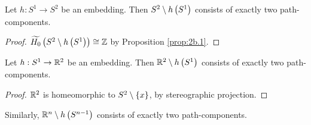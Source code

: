 \begin{corollary}
Let $ h : S^1 \to S^2 $ be an embedding. Then $ S^2 \setminus h\left( S^1 \right) $ consists of exactly two path-components.
\end{corollary}

\begin{proof}
$ \widetilde{H_0}\left( S^2 \setminus h\left( S^1 \right) \right) \cong \mathbb{Z} $ by Proposition \ref{prop:2b.1}.
\end{proof}

\pagebreak

\begin{corollary}
Let $ h : S^1 \to \mathbb{R}^2 $ be an embedding. Then $ \mathbb{R}^2 \setminus h\left( S^1 \right) $ consists of exactly two path-components.
\end{corollary}

\begin{proof}
$ \mathbb{R}^2 $ is homeomorphic to $ S^2 \setminus \left\{ x \right\} $, by stereographic projection.
\end{proof}

Similarly, $ \mathbb{R}^n \setminus h\left( S^{n - 1} \right) $ consists of exactly two path-components.


